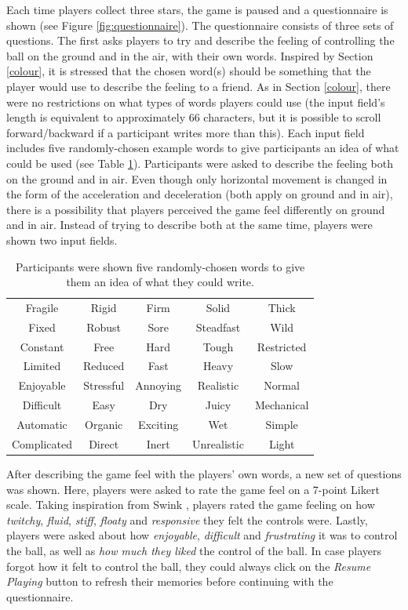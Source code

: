 Each time players collect three stars, the game is paused and a questionnaire is shown (see Figure \ref{fig:questionnaire}). The questionnaire consists of three sets of questions. The first asks players to try and describe the feeling of controlling the ball on the ground and in the air, with their own words. Inspired by Section \ref{colour}, it is stressed that the chosen word(s) should be something that the player would use to describe the feeling to a friend. As in Section \ref{colour}, there were no restrictions on what types of words players could use (the input field's length is equivalent to approximately 66 characters, but it is possible to scroll forward/backward if a participant writes more than this). Each input field includes five randomly-chosen example words to give participants an idea of what could be used (see Table \ref{table:wordsExamples}). Participants were asked to describe the feeling both on the ground and in air. Even though only horizontal movement is changed in the form of the acceleration and deceleration (both apply on ground and in air), there is a possibility that players perceived the game feel differently on ground and in air. Instead of trying to describe both at the same time, players were shown two input fields.

\begin{table} \centering
\scriptsize
\caption{Participants were shown five randomly-chosen words to give them an idea of what they could write.}
\label{table:wordsExamples}
\begin{tabular}{ccccc}
\toprule
Fragile & Rigid & Firm & Solid & Thick\\
Fixed & Robust & Sore & Steadfast & Wild\\
Constant & Free & Hard & Tough & Restricted\\
Limited & Reduced & Fast & Heavy & Slow\\
Enjoyable & Stressful & Annoying & Realistic & Normal\\
Difficult & Easy & Dry & Juicy & Mechanical\\
Automatic & Organic & Exciting & Wet & Simple\\
Complicated & Direct & Inert & Unrealistic & Light\\
\bottomrule
\end{tabular}
\end{table}

After describing the game feel with the players' own words, a new set of questions was shown. Here, players were asked to rate the game feel on a 7-point Likert scale. Taking inspiration from Swink \cite{swink}, players rated the game feeling on how \textit{twitchy}, \textit{fluid}, \textit{stiff}, \textit{floaty} and \textit{responsive} they felt the controls were. Lastly, players were asked about how \textit{enjoyable}, \textit{difficult} and \textit{frustrating} it was to control the ball, as well as \textit{how much they liked} the control of the ball. In case players forgot how it felt to control the ball, they could always click on the \textit{Resume Playing} button to refresh their memories before continuing with the questionnaire.

